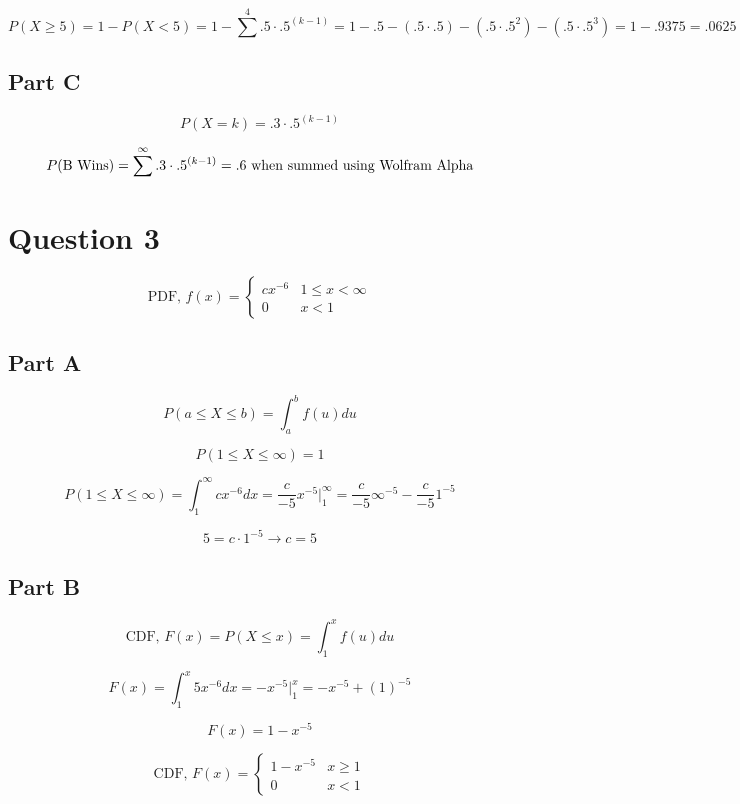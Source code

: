 \documentclass[letterpaper]{article}
\begin{document}
$$P(X \geq 5) = 1 - P(X < 5)= 1 - \sum^4 .5 \cdot .5^{(k-1)} = 1 - .5 - (.5 \cdot .5) - (.5 \cdot .5^2) - (.5 \cdot .5^3) = 1 - .9375 = .0625$$

\subsection*{Part C}

$$P(X = k) = .3 \cdot .5^{(k-1)}$$

$$P(\text{B Wins}) = \sum^{\infty} .3 \cdot .5^{(k-1)} = .6 \space \text{ when summed using Wolfram Alpha}$$

\newpage

\section*{Question 3}

$$
    \text{PDF, } f(x) = \begin{cases} cx^{-6} & 1 \leq x < \infty \\ 0 & x < 1 \end{cases}
$$

\subsection*{Part A}

$$P(a \leq X \leq b) = \int_a^b f(u)du$$

$$P(1 \leq X \leq \infty) = 1$$

$$P(1 \leq X \leq \infty) = \int_1^{\infty} c x^{-6} dx = \frac{c}{-5} x^{-5} \Big|_1^{\infty} = \frac{c}{-5} \infty^{-5} - \frac{c}{-5} 1^{-5}$$

$$5 = c \cdot 1^{-5} \longrightarrow c = 5$$

\subsection*{Part B}

$$\text{CDF, } F(x) = P(X \leq x) = \int_{1}^x f(u)du$$

$$F(x) = \int_{1}^x 5 x^{-6} dx = -x^{-5} \Big|_{1}^{x} = -x^{-5} + (1)^{-5}$$

$$F(x) = 1 - x^{-5}$$

$$\text{CDF, } F(x) =\begin{cases}
        1 - x^{-5}      &   x \geq 1    \\
        0               &   x < 1
\end{cases} $$
\end{document}
